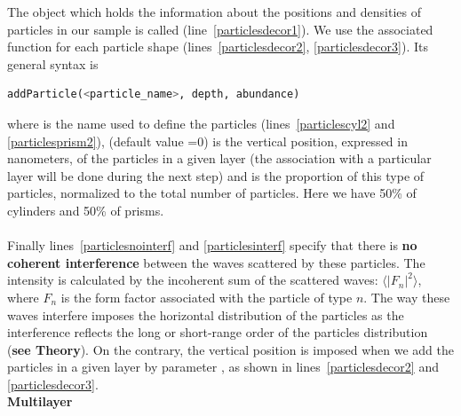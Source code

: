 \noindent The object which holds the information about the positions and densities of particles
in our sample is called 
(line~\ref{particlesdecor1}). We use the associated function 
for each particle shape (lines~\ref{particlesdecor2}, \ref{particlesdecor3}). Its general
syntax is 

\begin{lstlisting}[language=python, style=eclipse,numbers=none]
addParticle(<particle_name>, depth, abundance) 
\end{lstlisting}

\noindent  where  is the name used to define the particles
(lines~\ref{particlescyl2} and \ref{particlesprism2}), 
(default value =0)
is the vertical position, expressed in nanometers, of the particles in a given layer (the
association with a particular layer will be done during the next step) and
 is the proportion of this type of particles, 
normalized to the total number of particles. Here we have 50\% of cylinders
and 50\% of prisms. \\ 

\\


\noindent Finally lines~\ref{particlesnointerf} and
\ref{particlesinterf} specify that there is \textbf{no coherent interference} between
the waves scattered by these particles. The intensity is calculated by
the incoherent sum of the scattered waves: $\langle |F_n|^2\rangle$,
where $F_n$ is the form factor associated with the particle of type $n$.  The way these waves
interfere imposes the horizontal distribution of
the particles as
the interference reflects the long or short-range order of the
particles distribution (\textbf{see Theory}). On the contrary, the vertical position is
imposed when we add the particles in a given layer by parameter , as shown in lines~\ref{particlesdecor2} and \ref{particlesdecor3}. \\

\noindent \textbf{Multilayer}\\
  
